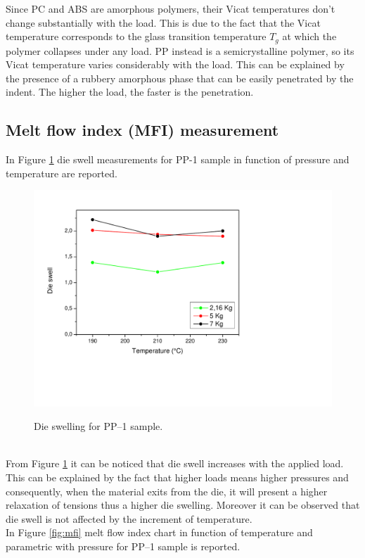 \documentclass[a4paper, 11pt]{article}
\begin{document}
Since PC and ABS are amorphous polymers, their Vicat temperatures don't change substantially with the load. This is due to the fact that the Vicat temperature corresponds to the glass transition temperature $T_{g}$ at which the polymer collapses under any load.
PP instead is a semicrystalline polymer, so its Vicat temperature varies considerably with the load. This can be explained by the presence of a rubbery amorphous phase that can be easily penetrated by the indent. The higher the load, the faster is the penetration.

\subsection{Melt flow index (MFI) measurement}

In Figure \ref{fig:dieswell} die swell measurements for PP-1 sample in function of pressure and temperature are reported.
\begin{figure}[h!]
	\centering
	{\includegraphics[scale=0.4]{dieswell}}
	\captionsetup{justification=centering}
	\caption{Die swelling for PP–1 sample.}
	\label{fig:dieswell}
\end{figure}\\
From Figure \ref{fig:dieswell} it can be noticed that die swell increases with the applied load. This can be explained by the fact that higher loads means higher pressures and consequently, when the material exits from the die, it will present a higher relaxation of tensions thus a higher die swelling. Moreover it can be observed that die swell is not affected by the increment of temperature. \\
In Figure \ref{fig:mfi} melt flow index chart in function of temperature and parametric with pressure for PP–1 sample is reported.
\end{document}
